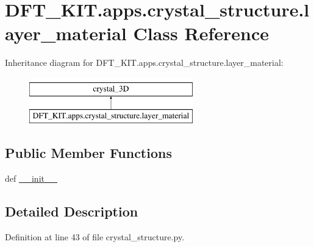 \hypertarget{class_d_f_t___k_i_t_1_1apps_1_1crystal__structure_1_1layer__material}{\section{D\+F\+T\+\_\+\+K\+I\+T.\+apps.\+crystal\+\_\+structure.\+layer\+\_\+material Class Reference}
\label{class_d_f_t___k_i_t_1_1apps_1_1crystal__structure_1_1layer__material}
}
Inheritance diagram for D\+F\+T\+\_\+\+K\+I\+T.\+apps.\+crystal\+\_\+structure.\+layer\+\_\+material\+:\begin{figure}[H]
\begin{center}
\leavevmode
\includegraphics[height=2.000000cm]{class_d_f_t___k_i_t_1_1apps_1_1crystal__structure_1_1layer__material}
\end{center}
\end{figure}
\subsection*{Public Member Functions}
\begin{DoxyCompactItemize}
\item 
def \hyperlink{class_d_f_t___k_i_t_1_1apps_1_1crystal__structure_1_1layer__material_aa5565f9f818510781490e372734c5926}{\+\_\+\+\_\+init\+\_\+\+\_\+}
\end{DoxyCompactItemize}


\subsection{Detailed Description}


Definition at line 43 of file crystal\+\_\+structure.\+py.



